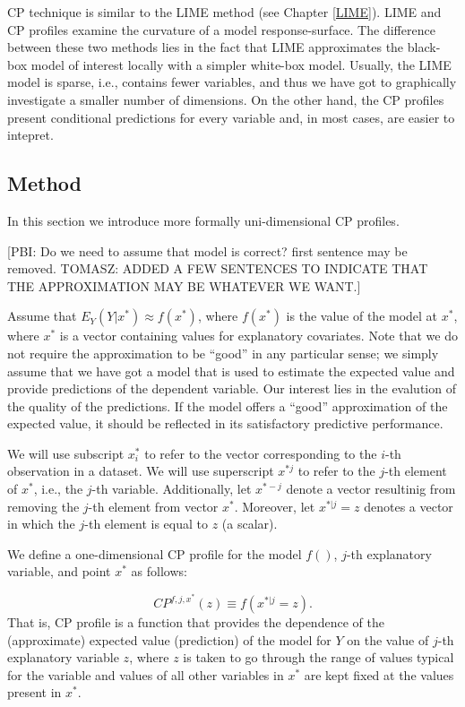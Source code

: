 \documentclass[12pt,]{krantz}
\theoremstyle{definition}
\theoremstyle{definition}
\theoremstyle{definition}
\theoremstyle{remark}
\begin{document}
CP technique is similar to the LIME method (see Chapter \ref{LIME}).
LIME and CP profiles examine the curvature of a model response-surface.
The difference between these two methods lies in the fact that LIME
approximates the black-box model of interest locally with a simpler
white-box model. Usually, the LIME model is sparse, i.e., contains fewer
variables, and thus we have got to graphically investigate a smaller
number of dimensions. On the other hand, the CP profiles present
conditional predictions for every variable and, in most cases, are
easier to intepret.

\hypertarget{method}{%
\subsection{Method}\label{method}}

In this section we introduce more formally uni-dimensional CP profiles.

{[}PBI: Do we need to assume that model is correct? first sentence may
be removed. TOMASZ: ADDED A FEW SENTENCES TO INDICATE THAT THE
APPROXIMATION MAY BE WHATEVER WE WANT.{]}

Assume that \(E_Y(Y | x^*) \approx f(x^*)\), where \(f(x^*)\) is the
value of the model at \(x^*\), where \(x^*\) is a vector containing
values for explanatory covariates. Note that we do not require the
approximation to be ``good'' in any particular sense; we simply assume
that we have got a model that is used to estimate the expected value and
provide predictions of the dependent variable. Our interest lies in the
evalution of the quality of the predictions. If the model offers a
``good'' approximation of the expected value, it should be reflected in
its satisfactory predictive performance.

We will use subscript \(x^*_i\) to refer to the vector corresponding to
the \(i\)-th observation in a dataset. We will use superscript
\(x^{*j}\) to refer to the \(j\)-th element of \(x^*\), i.e., the
\(j\)-th variable. Additionally, let \(x^{*-j}\) denote a vector
resultinig from removing the \(j\)-th element from vector \(x^{*}\).
Moreover, let \(x^{*|j}=z\) denotes a vector in which the \(j\)-th
element is equal to \(z\) (a scalar).

We define a one-dimensional CP profile for the model \(f()\), \(j\)-th
explanatory variable, and point \(x^*\) as follows:

\[
CP^{f, j, x^*}(z) \equiv f(x^{*|j} = z).
\] That is, CP profile is a function that provides the dependence of the
(approximate) expected value (prediction) of the model for \(Y\) on the
value of \(j\)-th explanatory variable \(z\), where \(z\) is taken to go
through the range of values typical for the variable and values of all
other variables in \(x^*\) are kept fixed at the values present in
\(x^*\).
\end{document}
